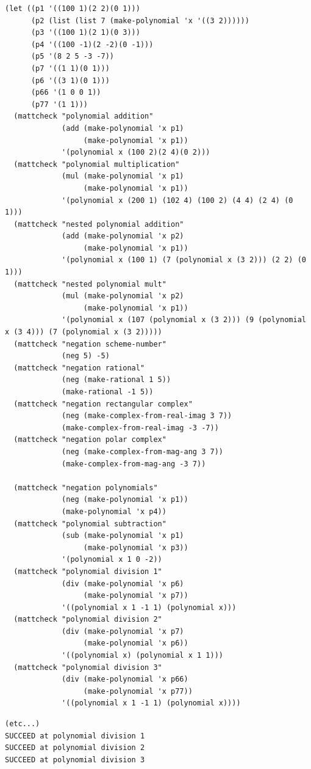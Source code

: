 \documentclass[final,fleqn,titlepage,twoside]{article}
\begin{document}
\begin{verbatim}
(let ((p1 '((100 1)(2 2)(0 1)))
      (p2 (list (list 7 (make-polynomial 'x '((3 2))))))
      (p3 '((100 1)(2 1)(0 3)))
      (p4 '((100 -1)(2 -2)(0 -1)))
      (p5 '(8 2 5 -3 -7))
      (p7 '((1 1)(0 1)))
      (p6 '((3 1)(0 1)))
      (p66 '(1 0 0 1))
      (p77 '(1 1)))
  (mattcheck "polynomial addition"
             (add (make-polynomial 'x p1)
                  (make-polynomial 'x p1))
             '(polynomial x (100 2)(2 4)(0 2)))
  (mattcheck "polynomial multiplication"
             (mul (make-polynomial 'x p1)
                  (make-polynomial 'x p1))
             '(polynomial x (200 1) (102 4) (100 2) (4 4) (2 4) (0 1)))
  (mattcheck "nested polynomial addition"
             (add (make-polynomial 'x p2)
                  (make-polynomial 'x p1))
             '(polynomial x (100 1) (7 (polynomial x (3 2))) (2 2) (0 1)))
  (mattcheck "nested polynomial mult"
             (mul (make-polynomial 'x p2)
                  (make-polynomial 'x p1))
             '(polynomial x (107 (polynomial x (3 2))) (9 (polynomial x (3 4))) (7 (polynomial x (3 2)))))
  (mattcheck "negation scheme-number"
             (neg 5) -5)
  (mattcheck "negation rational"
             (neg (make-rational 1 5))
             (make-rational -1 5))
  (mattcheck "negation rectangular complex"
             (neg (make-complex-from-real-imag 3 7))
             (make-complex-from-real-imag -3 -7))
  (mattcheck "negation polar complex"
             (neg (make-complex-from-mag-ang 3 7))
             (make-complex-from-mag-ang -3 7))

  (mattcheck "negation polynomials"
             (neg (make-polynomial 'x p1))
             (make-polynomial 'x p4))
  (mattcheck "polynomial subtraction"
             (sub (make-polynomial 'x p1)
                  (make-polynomial 'x p3))
             '(polynomial x 1 0 -2))
  (mattcheck "polynomial division 1"
             (div (make-polynomial 'x p6)
                  (make-polynomial 'x p7))
             '((polynomial x 1 -1 1) (polynomial x)))
  (mattcheck "polynomial division 2"
             (div (make-polynomial 'x p7)
                  (make-polynomial 'x p6))
             '((polynomial x) (polynomial x 1 1)))
  (mattcheck "polynomial division 3"
             (div (make-polynomial 'x p66)
                  (make-polynomial 'x p77))
             '((polynomial x 1 -1 1) (polynomial x))))
\end{verbatim}

\begin{verbatim}
(etc...)
SUCCEED at polynomial division 1
SUCCEED at polynomial division 2
SUCCEED at polynomial division 3
\end{verbatim}
\end{document}
